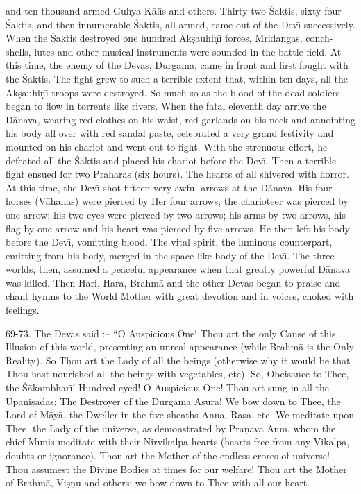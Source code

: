 and ten thousand armed Guhya K\=al\={\i}s and others. Thirty-two \'Saktis, sixty-four \'Saktis, and then innumerable \'Saktis, all armed, came out of the Dev\={\i} successively. When the \'Saktis destroyed one hundred Ak\d{s}auhi\d{n}\={\i} forces, Mridangas, conch-shells, lutes and other musical instruments were sounded in the battle-field. At this time, the enemy of the Devas, Durgama, came in front and first fought with the \'Saktis. The fight grew to such a terrible extent that, within ten days, all the Ak\d{s}auhi\d{n}\={\i} troops were destroyed. So much so as the blood of the dead soldiers began to flow in torrents like rivers. When the fatal eleventh day arrive the D\=anava, wearing red clothes on his waist, red garlands on his neck and annointing his body all over with red sandal paste, celebrated a very grand festivity and mounted on his chariot and went out to fight. With the strenuous effort, he defeated all the \'Saktis and placed his chariot before the Dev\={\i}. Then a terrible fight ensued for two Praharas (six hours). The hearts of all shivered with horror. At this time, the Dev\={\i} shot fifteen very awful arrows at the D\=anava. His four horses (V\=ahanas) were pierced by Her four arrows; the charioteer was pierced by one arrow; his two eyes were pierced by two arrows; his arms by two arrows, his flag by one arrow and his heart was pierced by five arrows. He then left his body before the Dev\={\i}, vomitting blood. The vital spirit, the luminous counterpart, emitting from his body, merged in the space-like body of the Dev\={\i}. The three worlds, then, assumed a peaceful appearance when that greatly powerful D\=anava was killed. Then Hari, Hara, Brahm\=a and the other Devas began to praise and chant hymns to the World Mother with great devotion and in voices, choked with feelings.

69-73. The Devas said :-- ``O Auspicious One! Thou art the only Cause of this Illusion of this world, presenting an unreal appearance (while Brahm\=a is the Only Reality). So Thou art the Lady of all the beings (otherwise why it would be that Thou hast nourished all the beings with vegetables, etc). So, Obeisance to Thee, the \'S\=akambhar\={\i}! Hundred-eyed! O Auspicious One! Thou art sung in all the Upani\d{s}adas; The Destroyer of the Durgama Asura! We bow down to Thee, the Lord of M\=ay\=a, the Dweller in the five sheaths Anna, Rasa, etc. We meditate upon Thee, the Lady of the universe, as demonstrated by Pra\d{n}ava Aum, whom the chief Munis meditate with their Nirvikalpa hearts (hearts free from any Vikalpa, doubts or ignorance). Thou art the Mother of the endless crores of universe! Thou assumest the Divine Bodies at times for our welfare! Thou art the Mother of Brahm\=a, Vi\d{s}\d{n}u and others; we bow down to Thee with all our heart.

